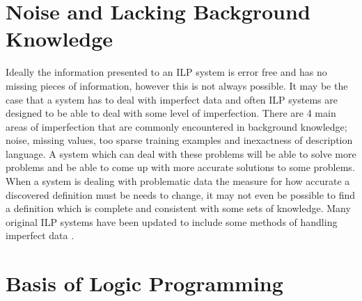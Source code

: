 \documentclass{article}
\begin{document}
\section{Noise and Lacking Background Knowledge}
Ideally the information presented to an ILP system is error free and has no
missing pieces of information, however this is not always possible. It may be
the case that a system has to deal with imperfect data and often ILP systems
are designed to be able to deal with some level of imperfection. There are 4
\cite{laz} main areas of imperfection that are commonly encountered in
background knowledge; noise, missing values, too sparse training examples and
inexactness of description language. A system which can deal with these
problems will be able to solve more problems and be able to come up with more
accurate solutions to some problems. When a system is dealing with problematic
data the measure for how accurate a discovered definition must be needs to
change, it may not even be possible to find a definition which is complete and
consistent with some sets of knowledge. Many original ILP systems have been
updated to include some methods of handling imperfect data \cite{ass}
\cite{cn2} \cite{cn22} \cite{c45}.

\section{Basis of Logic Programming}
\end{document}
